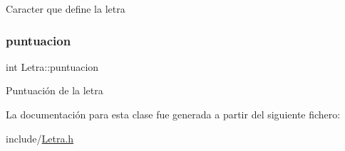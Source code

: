 Caracter que define la letra \mbox{\label{classLetra_a679c32bc028d79f633128de6c5971ae5}} 
\subsubsection{\texorpdfstring{puntuacion}{puntuacion}}
{\footnotesize\ttfamily int Letra\+::puntuacion\hspace{0.3cm}{\ttfamily [private]}}

Puntuación de la letra 

La documentación para esta clase fue generada a partir del siguiente fichero\+:\begin{DoxyCompactItemize}
\item 
include/\hyperlink{Letra_8h}{Letra.\+h}\end{DoxyCompactItemize}

